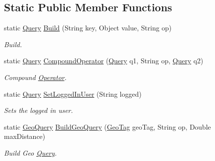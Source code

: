 \subsection*{Static Public Member Functions}
\begin{DoxyCompactItemize}
\item 
static \hyperlink{classcom_1_1shephertz_1_1app42_1_1paas_1_1sdk_1_1csharp_1_1storage_1_1_query}{Query} \hyperlink{classcom_1_1shephertz_1_1app42_1_1paas_1_1sdk_1_1csharp_1_1storage_1_1_query_builder_addc2fd57e1b5550edf5d6404a6755495}{Build} (String key, Object value, String op)
\begin{DoxyCompactList}\small\item\em Build. \end{DoxyCompactList}\item 
static \hyperlink{classcom_1_1shephertz_1_1app42_1_1paas_1_1sdk_1_1csharp_1_1storage_1_1_query}{Query} \hyperlink{classcom_1_1shephertz_1_1app42_1_1paas_1_1sdk_1_1csharp_1_1storage_1_1_query_builder_a8878f9531fed2e8f2749e1bf64c47c45}{Compound\+Operator} (\hyperlink{classcom_1_1shephertz_1_1app42_1_1paas_1_1sdk_1_1csharp_1_1storage_1_1_query}{Query} q1, String op, \hyperlink{classcom_1_1shephertz_1_1app42_1_1paas_1_1sdk_1_1csharp_1_1storage_1_1_query}{Query} q2)
\begin{DoxyCompactList}\small\item\em Compound \hyperlink{classcom_1_1shephertz_1_1app42_1_1paas_1_1sdk_1_1csharp_1_1storage_1_1_operator}{Operator}. \end{DoxyCompactList}\item 
static \hyperlink{classcom_1_1shephertz_1_1app42_1_1paas_1_1sdk_1_1csharp_1_1storage_1_1_query}{Query} \hyperlink{classcom_1_1shephertz_1_1app42_1_1paas_1_1sdk_1_1csharp_1_1storage_1_1_query_builder_aa5727689fbe9fc910e3a61d76695bf17}{Set\+Logged\+In\+User} (String logged)
\begin{DoxyCompactList}\small\item\em Sets the logged in user. \end{DoxyCompactList}\item 
static \hyperlink{classcom_1_1shephertz_1_1app42_1_1paas_1_1sdk_1_1csharp_1_1storage_1_1_geo_query}{Geo\+Query} \hyperlink{classcom_1_1shephertz_1_1app42_1_1paas_1_1sdk_1_1csharp_1_1storage_1_1_query_builder_a35915d27dddeee799200893bb03bc614}{Build\+Geo\+Query} (\hyperlink{classcom_1_1shephertz_1_1app42_1_1paas_1_1sdk_1_1csharp_1_1storage_1_1_geo_tag}{Geo\+Tag} geo\+Tag, String op, Double max\+Distance)
\begin{DoxyCompactList}\small\item\em Build Geo \hyperlink{classcom_1_1shephertz_1_1app42_1_1paas_1_1sdk_1_1csharp_1_1storage_1_1_query}{Query}. \end{DoxyCompactList}\end{DoxyCompactItemize}

